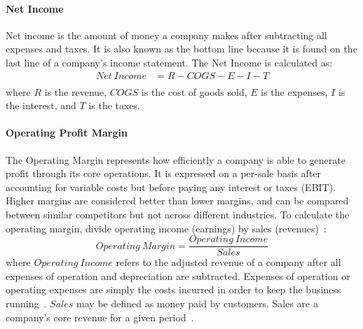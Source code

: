 \documentclass[../xlapes02]{subfiles}
\begin{document}
    \paragraph{Net Income}\label{par:net-income}
    Net income is the amount of money a company makes after subtracting all expenses and taxes. It is also known as the bottom line because it is found on the last line of a company's income statement. The Net Income is calculated as:
    \begin{equation}
        \begin{split}
            Net\ Income&=R-COGS-E-I-T\\
        \end{split}
    \end{equation}
    where $R$ is the revenue, $COGS$ is the cost of goods sold, $E$ is the expenses, $I$ is the interest, and $T$ is the taxes.

    \paragraph{Operating Profit Margin}\label{par:operating-profit-margin}
    The Operating Margin represents how efficiently a company is able to generate profit through its core operations. It is expressed on a per-sale basis after accounting for variable costs but before paying any interest or taxes (EBIT). Higher margins are considered better than lower margins, and can be compared between similar competitors but not across different industries. To calculate the operating margin, divide operating income (earnings) by sales (revenues)~\cite{investopedia-operating-margin}:
    \begin{equation}
        Operating\ Margin=\frac{Operating\ Income}{Sales}
    \end{equation}
    where $Operating\ Income$ refers to the adjusted revenue of a company after all expenses of operation and depreciation are subtracted. Expenses of operation or operating expenses are simply the costs incurred in order to keep the business running~\cite{investopedia-operating-income}. $Sales$ may be defined as money paid by customers. Sales are a company's core revenue for a given period~\cite{investopedia-operating-margin}.
\end{document}

